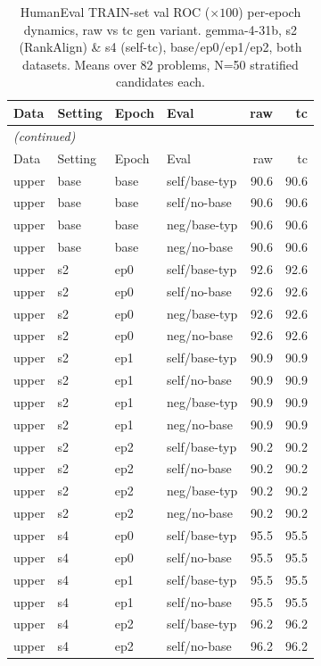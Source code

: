 {\small
\begin{longtable}{llll rr}
\caption{HumanEval TRAIN-set val ROC ($\times100$) per-epoch dynamics, raw vs tc gen variant. gemma-4-31b, s2 (RankAlign) \& s4 (self-tc), base/ep0/ep1/ep2, both datasets. Means over 82 problems, N=50 stratified candidates each.}\label{tab:he_train_val_roc}\\
\toprule
Data & Setting & Epoch & Eval & raw & tc \\
\midrule
\endfirsthead
\multicolumn{6}{l}{\itshape (continued)}\\
\toprule
Data & Setting & Epoch & Eval & raw & tc \\
\midrule
\endhead
\bottomrule
\endfoot
upper & base & base & self/base-typ & 90.6 & 90.6 \\
upper & base & base & self/no-base & 90.6 & 90.6 \\
upper & base & base & neg/base-typ & 90.6 & 90.6 \\
upper & base & base & neg/no-base & 90.6 & 90.6 \\
upper & s2 & ep0 & self/base-typ & 92.6 & 92.6 \\
upper & s2 & ep0 & self/no-base & 92.6 & 92.6 \\
upper & s2 & ep0 & neg/base-typ & 92.6 & 92.6 \\
upper & s2 & ep0 & neg/no-base & 92.6 & 92.6 \\
upper & s2 & ep1 & self/base-typ & 90.9 & 90.9 \\
upper & s2 & ep1 & self/no-base & 90.9 & 90.9 \\
upper & s2 & ep1 & neg/base-typ & 90.9 & 90.9 \\
upper & s2 & ep1 & neg/no-base & 90.9 & 90.9 \\
upper & s2 & ep2 & self/base-typ & 90.2 & 90.2 \\
upper & s2 & ep2 & self/no-base & 90.2 & 90.2 \\
upper & s2 & ep2 & neg/base-typ & 90.2 & 90.2 \\
upper & s2 & ep2 & neg/no-base & 90.2 & 90.2 \\
upper & s4 & ep0 & self/base-typ & 95.5 & 95.5 \\
upper & s4 & ep0 & self/no-base & 95.5 & 95.5 \\
upper & s4 & ep1 & self/base-typ & 95.5 & 95.5 \\
upper & s4 & ep1 & self/no-base & 95.5 & 95.5 \\
upper & s4 & ep2 & self/base-typ & 96.2 & 96.2 \\
upper & s4 & ep2 & self/no-base & 96.2 & 96.2 \\

\end{longtable}}
